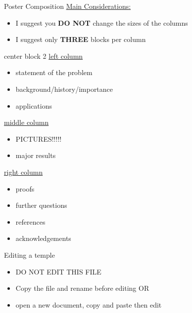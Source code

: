 \documentclass[leqno,presentation]{beamer}
\begin{document}
\begin{frame}
\begin{columns}[t]
\begin{column}{.45\linewidth}

\begin{block}{Poster Composition}
\underline{Main Considerations:}
\begin{itemize}
\item I suggest you \textbf{DO NOT} change the sizes of the columns
\item I suggest only \textbf{THREE} blocks per column
\end{itemize}
\end{block}

\begin{block}{center block 2}
\underline{left column}
\begin{itemize}
 \item statement of the problem
\item background/history/importance
\item applications
\end{itemize}
\underline{middle column}
\begin{itemize}
 \item PICTURES!!!!!
\item  major results
\end{itemize}
\underline{right column}
\begin{itemize}
\item proofs
\item further questions
\item references
\item acknowledgements
\end{itemize}
\end{block}

\begin{block}{Editing a temple}
\begin{itemize}
\item DO NOT EDIT THIS FILE
\item Copy the file and rename before editing OR
\item open a new document, copy and paste then edit
\end{itemize}
\end{block}


\end{column}
\end{columns}
\end{frame}
\end{document}
